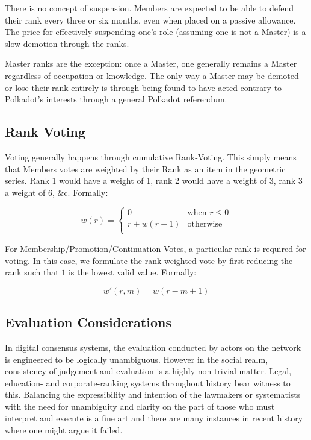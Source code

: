 \documentclass[9pt,oneside]{amsart}
\begin{document}
There is no concept of suspension. Members are expected to be able to defend their rank every three or six months, even when placed on a passive allowance. The price for effectively suspending one's role (assuming one is not a Master) is a slow demotion through the ranks.

Master ranks are the exception: once a Master, one generally remains a Master regardless of occupation or knowledge. The only way a Master may be demoted or lose their rank entirely is through being found to have acted contrary to Polkadot's interests through a general Polkadot referendum.

\subsection{Rank Voting}\label{rank-voting}

Voting generally happens through cumulative Rank-Voting. This simply means that Members votes are weighted by their Rank as an item in the geometric series. Rank 1 would have a weight of 1, rank 2 would have a weight of 3, rank 3 a weight of 6, \&c. Formally:

\begin{equation}
  w(r) = \begin{cases}
    0 & \text{when } r \leq 0 \\
    r + w(r - 1) & \text{otherwise} \\
  \end{cases}
\end{equation}

For Membership/Promotion/Continuation Votes, a particular rank is required for voting. In this case, we formulate the rank-weighted vote by first reducing the rank such that $1$ is the lowest valid value. Formally:

\begin{equation}
  w'(r, m) = w(r - m + 1)
\end{equation}

\subsection{Evaluation Considerations}

In digital consensus systems, the evaluation conducted by actors on the network is engineered to be logically unambiguous. However in the social realm, consistency of judgement and evaluation is a highly non-trivial matter. Legal, education- and corporate-ranking systems throughout history bear witness to this. Balancing the expressibility and intention of the lawmakers or systematists with the need for unambiguity and clarity on the part of those who must interpret and execute is a fine art and there are many instances in recent history where one might argue it failed.
\end{document}
